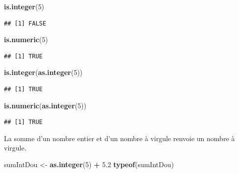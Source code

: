 \documentclass[
]{book}
\newenvironment{Shaded}{\begin{snugshade}}{\end{snugshade}}
\newcommand{\DecValTok}[1]{\textcolor[rgb]{0.00,0.00,0.81}{#1}}
\newcommand{\FloatTok}[1]{\textcolor[rgb]{0.00,0.00,0.81}{#1}}
\newcommand{\KeywordTok}[1]{\textcolor[rgb]{0.13,0.29,0.53}{\textbf{#1}}}
\newcommand{\NormalTok}[1]{#1}
\newcommand{\OperatorTok}[1]{\textcolor[rgb]{0.81,0.36,0.00}{\textbf{#1}}}
\newcommand{\StringTok}[1]{\textcolor[rgb]{0.31,0.60,0.02}{#1}}
\begin{document}
\begin{Shaded}
\begin{Highlighting}[]
\KeywordTok{is.integer}\NormalTok{(}\DecValTok{5}\NormalTok{)}
\end{Highlighting}
\end{Shaded}

\begin{verbatim}
## [1] FALSE
\end{verbatim}

\begin{Shaded}
\begin{Highlighting}[]
\KeywordTok{is.numeric}\NormalTok{(}\DecValTok{5}\NormalTok{)}
\end{Highlighting}
\end{Shaded}

\begin{verbatim}
## [1] TRUE
\end{verbatim}

\begin{Shaded}
\begin{Highlighting}[]
\KeywordTok{is.integer}\NormalTok{(}\KeywordTok{as.integer}\NormalTok{(}\DecValTok{5}\NormalTok{))}
\end{Highlighting}
\end{Shaded}

\begin{verbatim}
## [1] TRUE
\end{verbatim}

\begin{Shaded}
\begin{Highlighting}[]
\KeywordTok{is.numeric}\NormalTok{(}\KeywordTok{as.integer}\NormalTok{(}\DecValTok{5}\NormalTok{))}
\end{Highlighting}
\end{Shaded}

\begin{verbatim}
## [1] TRUE
\end{verbatim}

La somme d'un nombre entier et d'un nombre à virgule renvoie un nombre à virgule.

\begin{Shaded}
\begin{Highlighting}[]
\NormalTok{sumIntDou <-}\StringTok{ }\KeywordTok{as.integer}\NormalTok{(}\DecValTok{5}\NormalTok{) }\OperatorTok{+}\StringTok{ }\FloatTok{5.2}
\KeywordTok{typeof}\NormalTok{(sumIntDou)}
\end{Highlighting}
\end{Shaded}
\end{document}
